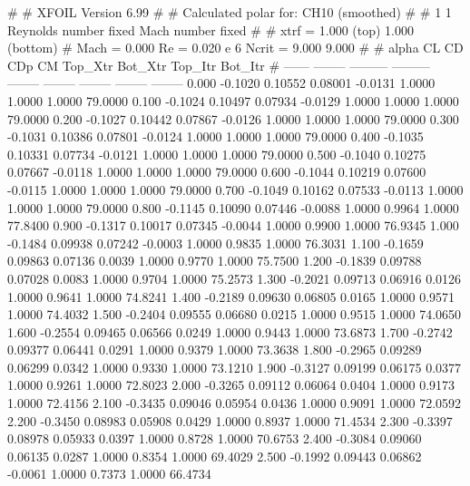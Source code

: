 #  
#       XFOIL         Version 6.99
#  
# Calculated polar for: CH10 (smoothed)                                 
#  
# 1 1 Reynolds number fixed          Mach number fixed         
#  
# xtrf =   1.000 (top)        1.000 (bottom)  
# Mach =   0.000     Re =     0.020 e 6     Ncrit =   9.000  9.000
#  
#   alpha    CL        CD       CDp       CM     Top_Xtr  Bot_Xtr  Top_Itr  Bot_Itr
#  ------ -------- --------- --------- -------- -------- -------- -------- --------
   0.000  -0.1020   0.10552   0.08001  -0.0131   1.0000   1.0000   1.0000  79.0000
   0.100  -0.1024   0.10497   0.07934  -0.0129   1.0000   1.0000   1.0000  79.0000
   0.200  -0.1027   0.10442   0.07867  -0.0126   1.0000   1.0000   1.0000  79.0000
   0.300  -0.1031   0.10386   0.07801  -0.0124   1.0000   1.0000   1.0000  79.0000
   0.400  -0.1035   0.10331   0.07734  -0.0121   1.0000   1.0000   1.0000  79.0000
   0.500  -0.1040   0.10275   0.07667  -0.0118   1.0000   1.0000   1.0000  79.0000
   0.600  -0.1044   0.10219   0.07600  -0.0115   1.0000   1.0000   1.0000  79.0000
   0.700  -0.1049   0.10162   0.07533  -0.0113   1.0000   1.0000   1.0000  79.0000
   0.800  -0.1145   0.10090   0.07446  -0.0088   1.0000   0.9964   1.0000  77.8400
   0.900  -0.1317   0.10017   0.07345  -0.0044   1.0000   0.9900   1.0000  76.9345
   1.000  -0.1484   0.09938   0.07242  -0.0003   1.0000   0.9835   1.0000  76.3031
   1.100  -0.1659   0.09863   0.07136   0.0039   1.0000   0.9770   1.0000  75.7500
   1.200  -0.1839   0.09788   0.07028   0.0083   1.0000   0.9704   1.0000  75.2573
   1.300  -0.2021   0.09713   0.06916   0.0126   1.0000   0.9641   1.0000  74.8241
   1.400  -0.2189   0.09630   0.06805   0.0165   1.0000   0.9571   1.0000  74.4032
   1.500  -0.2404   0.09555   0.06680   0.0215   1.0000   0.9515   1.0000  74.0650
   1.600  -0.2554   0.09465   0.06566   0.0249   1.0000   0.9443   1.0000  73.6873
   1.700  -0.2742   0.09377   0.06441   0.0291   1.0000   0.9379   1.0000  73.3638
   1.800  -0.2965   0.09289   0.06299   0.0342   1.0000   0.9330   1.0000  73.1210
   1.900  -0.3127   0.09199   0.06175   0.0377   1.0000   0.9261   1.0000  72.8023
   2.000  -0.3265   0.09112   0.06064   0.0404   1.0000   0.9173   1.0000  72.4156
   2.100  -0.3435   0.09046   0.05954   0.0436   1.0000   0.9091   1.0000  72.0592
   2.200  -0.3450   0.08983   0.05908   0.0429   1.0000   0.8937   1.0000  71.4534
   2.300  -0.3397   0.08978   0.05933   0.0397   1.0000   0.8728   1.0000  70.6753
   2.400  -0.3084   0.09060   0.06135   0.0287   1.0000   0.8354   1.0000  69.4029
   2.500  -0.1992   0.09443   0.06862  -0.0061   1.0000   0.7373   1.0000  66.4734
